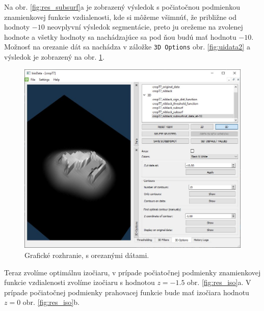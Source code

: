 \documentclass[a4paper,11pt,oneside]{article}%
\begin{document}
Na obr. \ref{fig:res_subsurf}a je zobrazený výsledok s počiatočnou podmienkou znamienkovej funkcie vzdialenosti, kde si môžeme všimnúť, že približne od hodnoty $-10$ neovplyvní výsledok segmentácie, preto ju orežeme na zvolenej hodnote a všetky hodnoty sa nachádzajúce sa pod ňou budú mať hodnotu $-10$.  Možnosť na orezanie dát sa nachádza v záložke \texttt{3D Options} obr. \ref{fig:uidata2} a výsledok je zobrazený na obr. \ref{fig:res_cut}. 

 
\begin{figure}[H]
 \begin{center} 
 \includegraphics[scale=0.50]{pics/res_cut_sdf.jpg}
\caption{Grafické rozhranie, s orezanými dátami.}
\label{fig:res_cut}
\end{center} 
\end{figure}

Teraz zvolíme optimálnu izočiaru, v prípade počiatočnej podmienky znamienkovej funkcie vzdialenosti zvolíme izočiaru s hodnotou $z = -1.5$ obr. \ref{fig:res_iso}a. V prípade počiatočnej podmienky prahovacej funkcie bude mať izočiara hodnotu $z = 0$ obr. \ref{fig:res_iso}b. 
\end{document}
